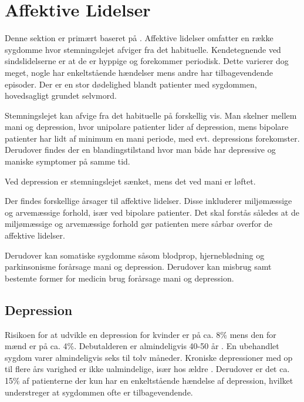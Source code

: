 
\section{Affektive Lidelser}\label{sec:affektivelidelser}
Denne sektion er primært baseret på \citet{misc:affektivelidelser, misc:netpsykdepression, misc:netpsykmani}.
Affektive lidelser omfatter en række sygdomme hvor stemningslejet afviger fra det habituelle.
Kendetegnende ved sindslidelserne er at de er hyppige og forekommer periodisk.
Dette varierer dog meget, nogle har enkeltstående hændelser mens andre har tilbagevendende episoder.
Der er en stor dødelighed blandt patienter med sygdommen, hovedsagligt grundet selvmord.

Stemningslejet kan afvige fra det habituelle på forskellig vis.
Man skelner mellem mani og depression, hvor unipolare patienter lider af depression, mens bipolare patienter har lidt af minimum en mani periode, med evt. depressions forekomster. Derudover findes der en blandingstilstand hvor man både har depressive og maniske symptomer på samme tid.

Ved depression er stemningslejet sænket, mens det ved mani er løftet.

Der findes forskellige årsager til affektive lidelser. 
Disse inkluderer miljømæssige og arvemæssige forhold, især ved bipolare patienter.
Det skal forstås således at de miljømæssige og arvemæssige forhold gør patienten mere sårbar overfor de affektive lidelser.

Derudover kan somatiske sygdomme såsom blodprop, hjerneblødning og parkinsonisme forårsage mani og depression.
Derudover kan misbrug samt bestemte former for medicin brug forårsage mani og depression.

\subsection{Depression}
Risikoen for at udvikle en depression for kvinder er på ca. 8\% mens den for mænd er på ca. 4\%\citep{misc:affektivelidelser}.
Debutalderen er almindeligvis 40-50 år \citep{misc:affektivelidelser}.
En ubehandlet sygdom varer almindeligvis seks til tolv måneder.
Kroniske depressioner med op til flere års varighed er ikke ualmindelige, især hos ældre \citep{misc:affektivelidelser}.
Derudover er det ca. 15\% af patienterne der kun har en enkeltstående hændelse af depression, hvilket understreger at sygdommen ofte er tilbagevendende.

